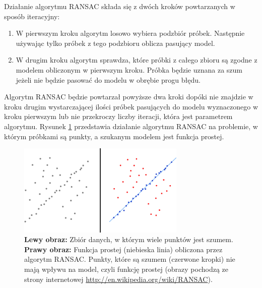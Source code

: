 Działanie algorytmu RANSAC składa się z dwóch kroków powtarzanych w sposób iteracyjny:

\begin{enumerate}
\item W pierwszym kroku algorytm losowo wybiera podzbiór próbek. Następnie używając tylko próbek z tego podzbioru oblicza pasujący model.
\item W drugim kroku algorytm sprawdza, które próbki z całego zbioru są zgodne z modelem obliczonym w pierwszym kroku. Próbka będzie uznana za szum jeżeli nie będzie pasować do modelu w obrębie progu błędu.
\end{enumerate}

Algorytm RANSAC będzie powtarzał powyższe dwa kroki dopóki nie znajdzie w kroku drugim wystarczającej ilości próbek pasujących do modelu wyznaczonego w kroku pierwszym lub nie przekroczy liczby iteracji, która jest parametrem algorytmu. Rysunek \ref{fig:proponowane_algorytmy:ransac} przedstawia działanie algorytmu RANSAC na problemie, w którym próbkami są punkty, a szukanym modelem jest funkcja prostej.

\begin{figure}[htb]
  \centering
  \includegraphics[width=8cm]{gfx/ransac}
  \caption{\textbf{Lewy obraz:} Zbiór danych, w którym wiele punktów jest szumem. \textbf{Prawy obraz:} Funkcja prostej (niebieska linia) obliczona przez algorytm RANSAC. Punkty, które są szumem (czerwone kropki) nie mają wpływu na model, czyli funkcję prostej (obrazy pochodzą ze strony internetowej \url{http://en.wikipedia.org/wiki/RANSAC}).}
  \label{fig:proponowane_algorytmy:ransac}
\end{figure}

